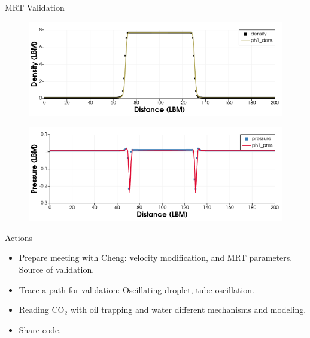 \documentclass{beamer}
\begin{document}
	\begin{frame}{MRT Validation}
		\begin{figure}
			\centering
			\includegraphics[scale=0.4]{pics/MRTValDen.png}
		\end{figure}
		\begin{figure}
			\centering
			\includegraphics[scale=0.4]{pics/MRTValPres.png}
		\end{figure}
	
	\end{frame}
	\begin{frame}{Actions}
		\begin{itemize}
			\item Prepare meeting with Cheng: velocity modification, and MRT parameters. Source of validation.
			\item Trace a path for validation: Oscillating droplet, tube oscillation. 
			\item Reading CO$_2$ with oil trapping and water different mechanisms and modeling.
			\item Share code.
			
		\end{itemize}
	\end{frame}
	
	
	
\end{document}
